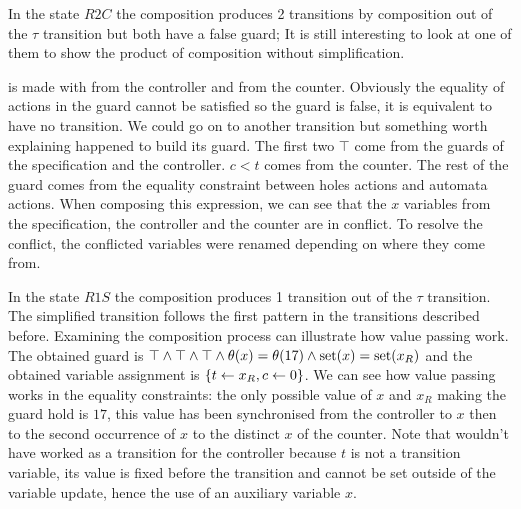 \documentclass{article}
\begin{document}
In the state \(R2C\) the composition produces 2 transitions by composition out of the \(\tau\) transition but both have a false guard; It is still interesting to look at one of them to show the product of composition without simplification.

 is made with  from the controller and  from the counter.
Obviously the equality of actions in the guard cannot be satisfied so the guard is false, it is equivalent to have no transition.
We could go on to another transition but something worth explaining happened to build its guard.
The first two \(\top\) come from the guards of the specification and the controller.
\(c < t\) comes from the counter.
The rest of the guard comes from the equality constraint between holes actions and automata actions.
When composing this expression, we can see that the \(x\) variables from the specification, the controller and the counter are in conflict.
To resolve the conflict, the conflicted variables were renamed depending on where they come from.

In the state \(R1S\) the composition produces 1 transition out of the \(\tau\) transition.
The simplified transition follows the first pattern in the transitions described before.
Examining the composition process can illustrate how value passing work.
The obtained guard is \(\top \wedge \top \wedge \top \wedge \theta{\left(x\right)} = \theta{\left(17\right)} \wedge \mathrm{set}{\left(x\right)} = \mathrm{set}{\left(x_R\right)}\) and the obtained variable assignment is \({\left\{t \gets x_R, c \gets 0\right\}}\).
We can see how value passing works in the equality constraints: the only possible value of \(x\) and \(x_R\) making the guard hold is \(17\), this value has been synchronised from the controller to \(x\) then to the second occurrence of \(x\) to the distinct \(x\) of the counter.
Note that  wouldn't have worked as a transition for the controller because \(t\) is not a transition variable, its value is fixed before the transition and cannot be set outside of the variable update, hence the use of an auxiliary variable \(x\).
\end{document}

